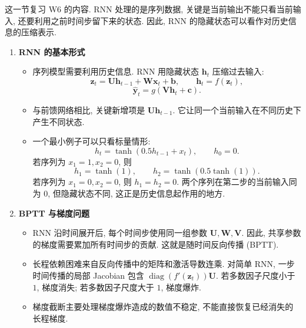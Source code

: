 \documentclass{../nndlcourse}
\begin{document}
这一节复习 W6 的内容. RNN 处理的是序列数据, 关键是当前输出不能只看当前输入, 还要利用之前时间步留下来的状态. 因此, RNN 的隐藏状态可以看作对历史信息的压缩表示.

\begin{enumerate}
    \item \textbf{RNN 的基本形式}
    \begin{itemize}
        \item 序列模型需要利用历史信息. RNN 用隐藏状态 $\boldsymbol{h}_t$ 压缩过去输入:
        \[
            \boldsymbol{z}_t
            =
            \boldsymbol{U}\boldsymbol{h}_{t-1}
            +
            \boldsymbol{W}\boldsymbol{x}_t
            +
            \boldsymbol{b},
            \qquad
            \boldsymbol{h}_t=f(\boldsymbol{z}_t),
        \]
        \[
            \hat{\boldsymbol{y}}_t
            =
            g\left(\boldsymbol{V}\boldsymbol{h}_t+\boldsymbol{c}\right).
        \]
        \item 与前馈网络相比, 关键新增项是 $\boldsymbol{U}\boldsymbol{h}_{t-1}$. 它让同一个当前输入在不同历史下产生不同状态.
        \item 一个最小例子可以只看标量情形:
        \[
            h_t=\tanh(0.5h_{t-1}+x_t),
            \qquad
            h_0=0.
        \]
        若序列为 $x_1=1,x_2=0$, 则
        \[
            h_1=\tanh(1),
            \qquad
            h_2=\tanh(0.5\tanh(1)).
        \]
        若序列为 $x_1=0,x_2=0$, 则 $h_1=h_2=0$. 两个序列在第二步的当前输入同为 $0$, 但隐藏状态不同, 这正是历史信息起作用的地方.
    \end{itemize}

    \item \textbf{BPTT 与梯度问题}
    \begin{itemize}
        \item RNN 沿时间展开后, 每个时间步使用同一组参数 $\boldsymbol{U},\boldsymbol{W},\boldsymbol{V}$. 因此, 共享参数的梯度需要累加所有时间步的贡献. 这就是随时间反向传播 (BPTT).
        \item 长程依赖困难来自反向传播中的矩阵和激活导数连乘. 对简单 RNN, 一步时间传播的局部 Jacobian 包含 $\operatorname{diag}(f'(\boldsymbol{z}_t))\boldsymbol{U}$. 若多数因子尺度小于 $1$, 梯度消失; 若多数因子尺度大于 $1$, 梯度爆炸.
        \item 梯度截断主要处理梯度爆炸造成的数值不稳定, 不能直接恢复已经消失的长程梯度.
    \end{itemize}


\end{enumerate}
\end{document}
